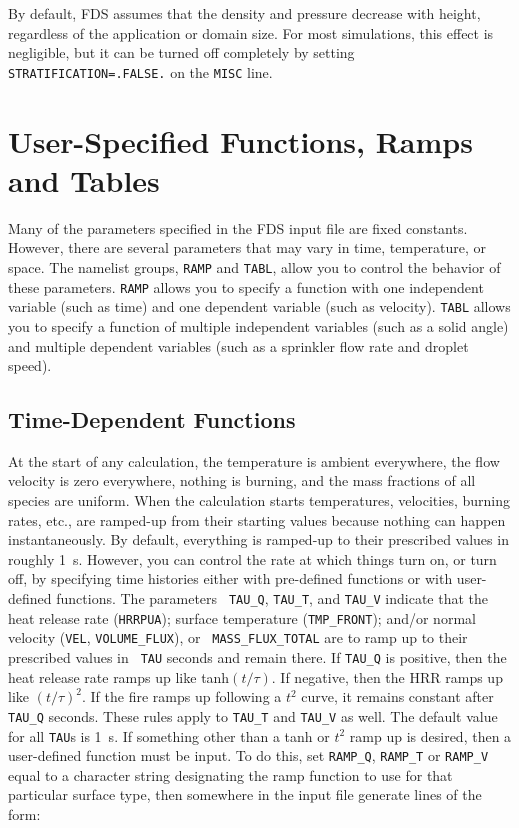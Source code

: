 \documentclass[11pt]{book}
\newcommand{\ct}{\tt\small}
\begin{document}
By default, FDS assumes that the density and pressure decrease with height, regardless of the
application or domain size. For most simulations, this effect is negligible, but it can be
turned off completely by setting {\ct STRATIFICATION=.FALSE.} on the {\ct MISC} line.






\chapter{User-Specified Functions, Ramps and Tables}
\label{info:RAMP}


Many of the parameters specified in the FDS input file are fixed constants. However, there are several parameters that may vary in
time, temperature, or space. The namelist groups,
{\ct RAMP} and {\ct TABL}, allow you to control the behavior of these parameters.  {\ct RAMP} allows you
to specify a function with one independent variable (such as time) and one dependent variable (such as velocity).
{\ct TABL} allows you to specify a function of multiple independent variables (such as a solid angle) and multiple
dependent variables (such as a sprinkler flow rate and droplet speed).



\section{Time-Dependent Functions}

\label{info:RAMP_Time}

At the start of any calculation, the temperature is ambient
everywhere, the flow velocity is zero everywhere, nothing is burning,
and the mass fractions of all species are uniform.  When the
calculation starts temperatures, velocities, burning rates,
etc., are ramped-up from their starting values because nothing can
happen instantaneously. By default, everything is ramped-up to their
prescribed values in roughly 1~s. However, you can control the rate at which
things turn on, or turn off, by specifying time histories either with
pre-defined functions or with user-defined functions.  The parameters {\ct
TAU\_Q}, {\ct TAU\_T}, and {\ct TAU\_V} indicate that the heat release
rate ({\ct HRRPUA}); surface temperature ({\ct TMP\_FRONT}); and/or
normal velocity ({\ct VEL}, {\ct VOLUME\_FLUX}), or {\ct
MASS\_FLUX\_TOTAL} are to ramp up to their prescribed values in {\ct
TAU} seconds and remain there.  If {\ct TAU\_Q} is positive, then the
heat release rate ramps up like tanh$(t/\tau)$. If negative, then the
HRR ramps up like $(t/\tau)^2$. If the fire ramps up following a $t^2$
curve, it remains constant after {\ct TAU\_Q} seconds.  These rules
apply to {\ct TAU\_T} and {\ct TAU\_V} as well.  The default value for
all {\ct TAU}s is 1~s.  If something other than a tanh or $t^2$ ramp
up is desired, then a user-defined function must be input. To
do this, set {\ct RAMP\_Q}, {\ct RAMP\_T} or {\ct RAMP\_V} equal to a
character string designating the ramp function to use for that
particular surface type, then somewhere in the input file generate
lines of the form:
\end{document}
